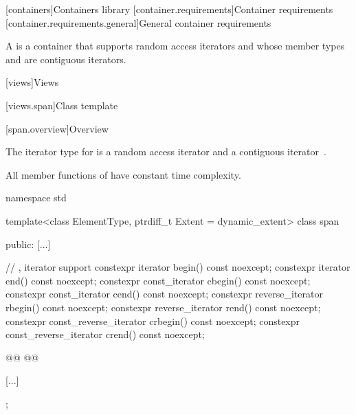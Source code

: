 
[containers]{Containers library}
\setcounter{section}{1}
[container.requirements]{Container requirements}
[container.requirements.general]{General container requirements}


\setcounter{Paras}{12}
\pnum
{}%
A 
is a container that supports random access iterators
and whose member types  and 
are contiguous iterators.

\setcounter{section}{6}
[views]{Views}

\setcounter{subsection}{2}
[views.span]{Class template }

[span.overview]{Overview}

\setcounter{Paras}{3}
\pnum
The iterator type for  is a random access iterator and a contiguous
iterator~.

\pnum
All member functions of  have constant time complexity.

%
\begin{codeblock}
namespace std {
  template<class ElementType, ptrdiff_t Extent = dynamic_extent>
  class span {
  public:
    [...]

    // , iterator support
    constexpr iterator begin() const noexcept;
    constexpr iterator end() const noexcept;
    constexpr const_iterator cbegin() const noexcept;
    constexpr const_iterator cend() const noexcept;
    constexpr reverse_iterator rbegin() const noexcept;
    constexpr reverse_iterator rend() const noexcept;
    constexpr const_reverse_iterator crbegin() const noexcept;
    constexpr const_reverse_iterator crend() const noexcept;

    @@
    @@

    [...]
  };
}
\end{codeblock}
